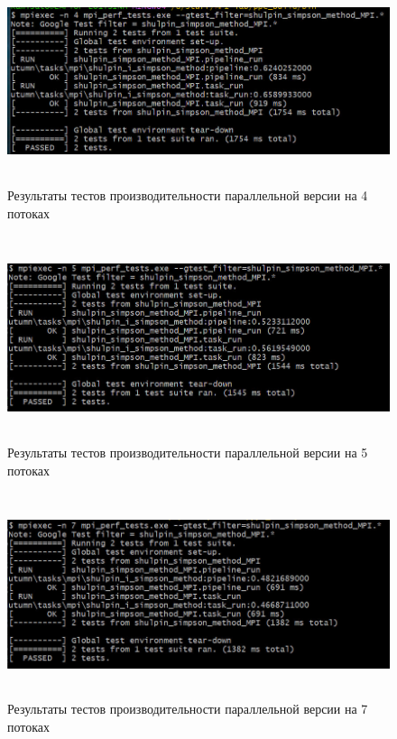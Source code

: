 \documentclass[12pt,a4paper]{article}
\begin{document}
\begin{figure}[H]
\centering
\includegraphics[height=6cm]{img/4nmpiperftest.jpg}
\caption{\label{fig:visualClass} Результаты тестов производительности параллельной версии на 4 потоках}
\end{figure}

\begin{figure}[H]
\centering
\includegraphics[height=6cm]{img/5nmpiperftest.jpg}
\caption{\label{fig:visualClass} Результаты тестов производительности параллельной версии на 5 потоках}
\end{figure}

\begin{figure}[H]
\centering
\includegraphics[height=6cm]{img/7nmpiperftest.jpg}
\caption{\label{fig:visualClass} Результаты тестов производительности параллельной версии на 7 потоках}
\end{figure}
\end{document}
